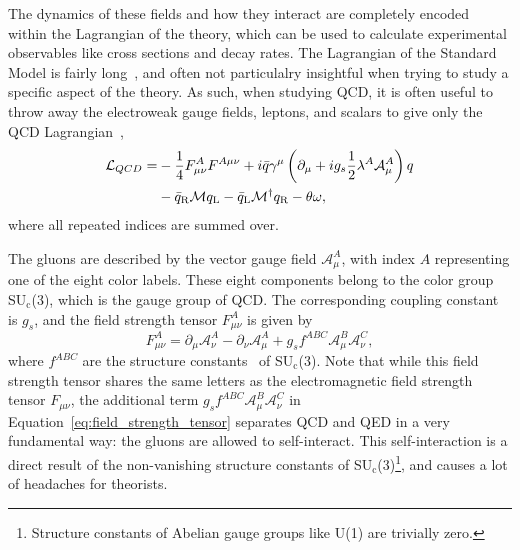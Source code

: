 The dynamics of these fields and how they interact are completely encoded within the Lagrangian of the theory, which can be used to calculate experimental observables like cross sections and decay rates. The Lagrangian of the Standard Model is fairly long~\cite{StandardModelLength1, StandardModelLength2}, and often not particulalry insightful when trying to study a specific aspect of the theory. As such, when studying QCD, it is often useful to throw away the electroweak gauge fields, leptons, and scalars to give only the QCD Lagrangian~\cite{QCDLagrangian},
%
\begin{align*}
    \label{eq:qcd_lagrangian}
    \mathcal{L}_{Q C D}= & -\frac{1}{4} F_{\mu \nu}^A F^{A \space \mu \nu}+i \bar{q} \gamma^\mu\left(\partial_\mu+i g_s \frac{1}{2} \lambda^A \mathcal{A}_\mu^A\right) q \\
    & -\bar{q}_{\mathrm{R}} \mathcal{M} q_{\mathrm{L}}-\bar{q}_{\mathrm{L}} \mathcal{M}^{\dagger} q_{\mathrm{R}}-\theta \omega,
\end{align*}
%
where all repeated indices are summed over.

The gluons are described by the vector gauge field $\mathcal{A}_\mu^A$, with index $A$ representing one of the eight color labels. These eight components belong to the color group SU$_\text{c}$(3), which is the gauge group of QCD. The corresponding coupling constant is $g_{s}$, and the field strength tensor $F_{\mu \nu}^A$ is given by
%
\begin{equation}
    \label{eq:field_strength_tensor}
    F_{\mu \nu}^A = \partial_\mu \mathcal{A}_\nu^A - \partial_\nu \mathcal{A}_\mu^A + g_s f^{ABC} \mathcal{A}_\mu^B \mathcal{A}_\nu^C,
\end{equation}
%
where $f^{ABC}$ are the structure constants~\cite{StructureConstants} of SU$_\text{c}$(3). Note that while this field strength tensor shares the same letters as the electromagnetic field strength tensor $F_{\mu \nu}$, the additional term $g_s f^{ABC} \mathcal{A}_\mu^B \mathcal{A}_\nu^C$ in Equation~\ref{eq:field_strength_tensor} separates QCD and QED in a very fundamental way: the gluons are allowed to self-interact. This self-interaction is a direct result of the non-vanishing structure constants of SU$_\text{c}$(3)\footnote{Structure constants of Abelian gauge groups like U(1) are trivially zero.}, and causes a lot of headaches for theorists.

